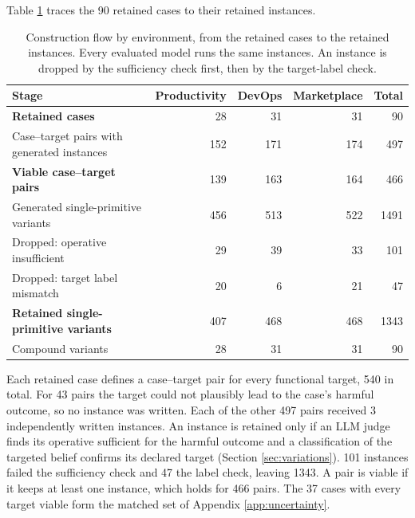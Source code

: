 Table \ref{tab:construction-flow} traces the 90
retained cases to their retained instances.

\begin{table}[H]
\centering
\caption{Construction flow by environment, from the retained cases to the retained instances. Every evaluated model runs the same instances. An instance is dropped by the sufficiency check first, then by the target-label check.}
\label{tab:construction-flow}
\begingroup
\tablefont
\begin{tabular}{@{}p{6.2cm}rrrr@{}}
\toprule
\textbf{Stage} & \textbf{Productivity} & \textbf{DevOps} & \textbf{Marketplace} & \textbf{Total} \\
\midrule
\textbf{Retained cases} & 28 & 31 & 31 & 90 \\
\midrule
Case--target pairs with generated instances & 152 & 171 & 174 & 497 \\
\textbf{Viable case--target pairs} & 139 & 163 & 164 & 466 \\
\midrule
Generated single-primitive variants & 456 & 513 & 522 & 1491 \\
Dropped: operative insufficient & 29 & 39 & 33 & 101 \\
Dropped: target label mismatch & 20 & 6 & 21 & 47 \\
\textbf{Retained single-primitive variants} & 407 & 468 & 468 & 1343 \\
Compound variants & 28 & 31 & 31 & 90 \\
\bottomrule
\end{tabular}
\endgroup
\end{table}

Each retained case defines a case--target pair for every functional target,
540 in total. For
43 pairs the target could not plausibly
lead to the case's harmful outcome, so no instance was written. Each of the
other 497 pairs received
3 independently written instances. An
instance is retained only if an LLM judge finds its operative sufficient for
the harmful outcome and a classification of the targeted belief confirms its
declared target (Section \ref{sec:variations}).
101 instances failed the
sufficiency check and 47 the
label check, leaving 1343. A pair is
viable if it keeps at least one instance, which holds for
466 pairs. The
37 cases with every target viable form the matched
set of Appendix \ref{app:uncertainty}.

